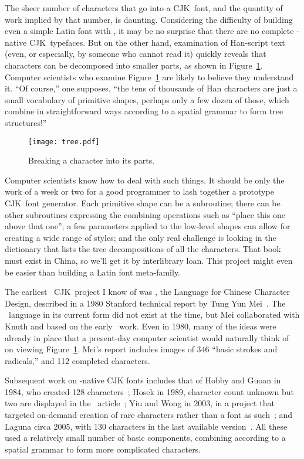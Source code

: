 \documentclass{ltugboat}
\def\CJK{CJK}
\begin{document}
The sheer number of characters that go into a \CJK\ font, and the quantity
of work implied by that number, is daunting.  Considering the difficulty of
building even a simple Latin font with \MF, it may be no surprise that there
are no complete \MF-native \CJK\ typefaces.  But on the other hand,
examination of Han-script text (even, or especially, by someone who cannot
read it) quickly reveals that characters can be decomposed into
\linebreak%
smaller
parts, as shown in Figure~\ref{fig:tree}.  Computer scientists who examine
Figure~\ref{fig:tree} are likely to believe they understand it.  ``Of
course,'' one supposes, ``the tens of thousands of Han characters are just a
small vocabulary of primitive shapes, perhaps only a few dozen of those,
which combine in straightforward ways according to a spatial grammar to form
tree structures!''

\begin{figure}
\texttt{[image: tree.pdf]}
\caption{Breaking a character into its parts.}
\label{fig:tree}
\end{figure}

Computer scientists know how to deal with such things.  It should be only
the work of a week or two for a good programmer to lash together a prototype
\CJK\ font generator.  Each primitive shape can be a subroutine; there can
be other subroutines expressing the combining operations such as ``place
this one above that one''; a few parameters applied to the low-level shapes
can allow for creating a wide range of styles; and the only real challenge
is looking in the dictionary that lists the tree decompositions of all the
characters.  That book must exist in China, so we'll get it by interlibrary
loan.  This project might even be easier than building a Latin font
meta-family.

The earliest \MF\ \CJK\ project I know of was , the Language for
Chinese Character Design, described in a 1980 Stanford technical report by
Tung Yun Mei~\cite{Mei:LCCD}.  The \MF\ language in its current form did not
exist at the time, but Mei collaborated with Knuth and based  on
the early \MF\ work.  Even in 1980, many of the ideas were already in place
that a present-day computer scientist would naturally think of on viewing
Figure~\ref{fig:tree}.  Mei's report includes images of 346 ``basic strokes
and radicals,'' and 112 completed characters.

Subsequent work on \MF-native \CJK
\linebreak%
fonts includes that of Hobby and Guoan
in 1984, who created 128 characters~\cite{Hobby:Chinese}; Hosek in 1989,
character count unknown but two are displayed in the \TUB\
article~\cite{Hosek:Design}; Yiu and Wong in 2003, in a project that
targeted on-demand creation of rare characters rather than a font as
such~\cite{Yiu:Chinese}; and Laguna circa 2005, with 130 characters in the
last available version~\cite{Laguna:Hong}.  All these used a relatively
small number of basic components, combining according to a spatial grammar
to form more complicated characters.
\end{document}
